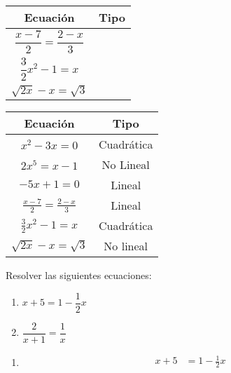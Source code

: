 \documentclass[11pt,a4]{aleph-examen}
\begin{document}
\begin{preguntas}
\begin{multicols}{2}
\begin{center}
    \begin{tabular}{c|c}
        Ecuación & \hspace{1cm}Tipo\hspace{1cm}  \\ \midrule
        $\dfrac{x-7}{2} = \dfrac{2-x}{3}$ &  \\[2mm]\midrule
        $\dfrac{3}{2}x^2 - 1 = x$ & \\[2mm]\midrule
        $\sqrt{2x} - x = \sqrt{3}$ &\\\bottomrule
    \end{tabular}
\end{center}
\end{multicols}
\begin{respuesta}
\begin{center}
    \begin{tabular}{c|c}
        Ecuación & Tipo  \\ \midrule
        $x^2 - 3x = 0$ &  Cuadrática \\[2mm]\midrule
        $2x^5  = x - 1$ & No Lineal \\[2mm]\midrule
        $-5x + 1 = 0$ & Lineal \\[2mm]\midrule
        $\frac{x-7}{2} = \frac{2-x}{3}$ & Lineal \\[2mm]\midrule
        $\frac{3}{2}x^2 - 1 = x$ & Cuadrática \\[2mm]\midrule
        $\sqrt{2x} - x = \sqrt{3}$ & No lineal\\\bottomrule
    \end{tabular}
\end{center}
\end{respuesta}
\item Resolver las siguientes ecuaciones:
\begin{multicols}{2}
    \begin{enumerate}[label=\textit{\alph*)}]
        \item $x+5 = 1 - \dfrac{1}{2}x$
        \item $\dfrac{2}{x+1} = \dfrac{1}{x}$
    \end{enumerate}
\end{multicols}
\begin{respuesta}
    \begin{enumerate}[label=\textit{\alph*)}]
        \item 
        $$
        \begin{aligned}
            x+5 &= 1 - \frac{1}{2}x \\

\end{aligned}$$
\end{enumerate}
\end{respuesta}
\end{preguntas}
\end{document}
